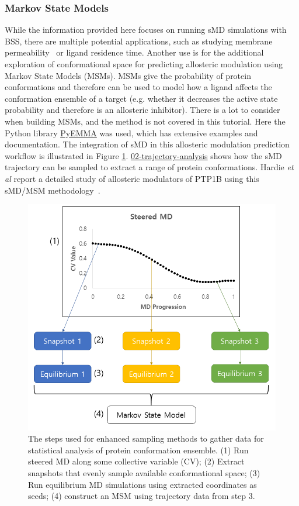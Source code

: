 \subsubsection{Markov State Models}
While the information provided here focuses on running sMD simulations with BSS, there are multiple potential applications, such as studying membrane permeability~\cite{Wells2007} or ligand residence time\cite{Potterton2019}. Another use is for the additional exploration of conformational space for predicting allosteric modulation using Markov State Models (MSMs). MSMs give the probability of protein conformations and therefore can be used to model how a ligand affects the conformation ensemble of a target (e.g. whether it decreases the active state probability and therefore is an allosteric inhibitor). There is a lot to consider when building MSMs, and the method is not covered in this tutorial. Here the Python library \href{http://emma-project.org/latest/}{PyEMMA} was used, which has extensive examples and documentation\cite{Wehmeyer_2019}. The integration of sMD in this allosteric modulation prediction workflow is illustrated in Figure \ref{fig:ensemble-protocol}. \href{https://github.com/OpenBioSim/BioSimSpaceTutorials/blob/main/03_steered_md/02_trajectory_analysis.ipynb}{02-trajectory-analysis} shows how the sMD trajectory can be sampled to extract a range of protein conformations. Hardie \emph{et al} report a detailed study of allosteric modulators of PTP1B using this sMD/MSM methodology~\cite{Hardie2023}.

\begin{figure}[htp]
\includegraphics[width=\linewidth]{LIVECOMS/03_steered_md/ensemble-md-protocol.png}
\caption{The steps used for enhanced sampling methods to gather data for statistical analysis of protein conformation ensemble. (1) Run steered MD along some collective variable (CV); (2) Extract snapshots that evenly sample available conformational space; (3) Run equilibrium MD simulations using extracted coordinates as seeds; (4) construct an MSM using trajectory data from step 3.}
\label{fig:ensemble-protocol}
\end{figure}